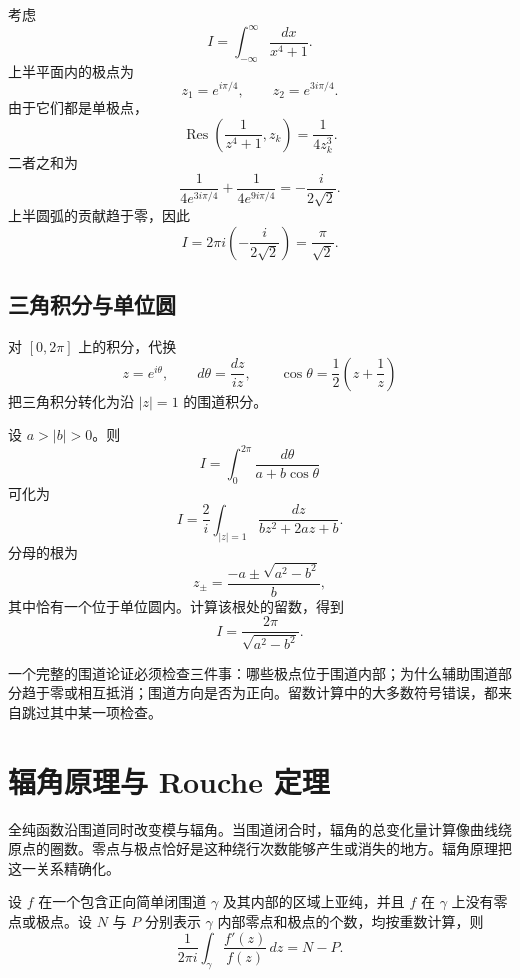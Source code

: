 \begin{example}[四次分母]
考虑
\[
    I=\int_{-\infty}^{\infty}\frac{dx}{x^4+1}.
\]
上半平面内的极点为
\[
    z_1=e^{i\pi/4},\qquad z_2=e^{3i\pi/4}.
\]
由于它们都是单极点，
\[
    \operatorname{Res}\left(\frac{1}{z^4+1},z_k\right)
    =\frac{1}{4z_k^3}.
\]
二者之和为
\[
    \frac{1}{4e^{3i\pi/4}}+\frac{1}{4e^{9i\pi/4}}
    =-\frac{i}{2\sqrt2}.
\]
上半圆弧的贡献趋于零，因此
\[
    I=2\pi i\left(-\frac{i}{2\sqrt2}\right)
    =\frac{\pi}{\sqrt2}.
\]
\end{example}

\subsection{三角积分与单位圆}

对 $[0,2\pi]$ 上的积分，代换
\[
    z=e^{i\theta},\qquad
    d\theta=\frac{dz}{iz},\qquad
    \cos\theta=\frac12\left(z+\frac1z\right)
\]
把三角积分转化为沿 $|z|=1$ 的围道积分。

\begin{example}
设 $a>|b|>0$。则
\[
    I=\int_0^{2\pi}\frac{d\theta}{a+b\cos\theta}
\]
可化为
\[
    I=\frac{2}{i}\int_{|z|=1}
    \frac{dz}{bz^2+2az+b}.
\]
分母的根为
\[
    z_{\pm}=\frac{-a\pm\sqrt{a^2-b^2}}{b},
\]
其中恰有一个位于单位圆内。计算该根处的留数，得到
\[
    I=\frac{2\pi}{\sqrt{a^2-b^2}}.
\]
\end{example}

\begin{note}
一个完整的围道论证必须检查三件事：哪些极点位于围道内部；为什么辅助围道部分趋于零或相互抵消；围道方向是否为正向。留数计算中的大多数符号错误，都来自跳过其中某一项检查。
\end{note}

\section{辐角原理与 Rouche 定理}

全纯函数沿围道同时改变模与辐角。当围道闭合时，辐角的总变化量计算像曲线绕原点的圈数。零点与极点恰好是这种绕行次数能够产生或消失的地方。辐角原理把这一关系精确化。

\begin{theorem}[辐角原理]
设 $f$ 在一个包含正向简单闭围道 $\gamma$ 及其内部的区域上亚纯，并且 $f$ 在 $\gamma$ 上没有零点或极点。设 $N$ 与 $P$ 分别表示 $\gamma$ 内部零点和极点的个数，均按重数计算，则
\[
    \frac{1}{2\pi i}\int_\gamma\frac{f'(z)}{f(z)}\,dz=N-P.
\]
\end{theorem}

